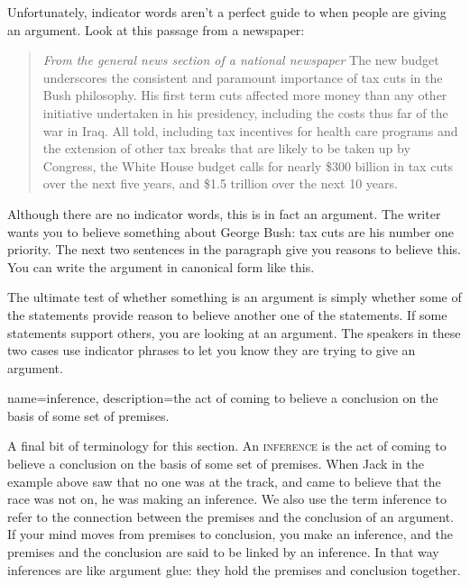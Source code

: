 Unfortunately, indicator words aren't a perfect guide to when people are giving an argument. Look at this passage from a newspaper:

\begin{quotation}
\noindent \textit{From the general news section of a national newspaper} The new budget underscores the consistent and paramount importance of tax cuts in the Bush philosophy. His first term cuts affected more money than any other initiative undertaken in his presidency, including the costs thus far of the war in Iraq. All told, including tax incentives for health care programs and the extension of other tax breaks that are likely to be taken up by Congress, the White House budget calls for nearly \$300 billion in tax cuts over the next five years, and \$1.5 trillion over the next 10 years.  \citep{Toner2006}
\end{quotation}

Although there are no indicator words, this is in fact an argument. The writer wants you to believe something about George Bush: tax cuts are his number one priority. The next two sentences in the paragraph give you reasons to believe this. You can write the argument in canonical form like this.

\begin{kormanize}
\end{kormanize}

The ultimate test of whether something is an argument is simply whether some of the statements provide reason to believe another one of the statements. If some statements support others, you are looking at an argument. The speakers in these two cases use indicator phrases to let you know they are trying to give an argument.

{
name=inference,
description={the act of coming to believe a conclusion on the basis of some set of premises.}
}

A final bit of terminology for this section. An \textsc{\gls{inference}} \label{def:Inference} is the act of coming to believe a conclusion on the basis of some set of premises. When Jack in the example above saw that no one was at the track, and came to believe that the race was not on, he was making an inference. We also use the term inference to refer to the connection between the premises and the conclusion of an argument. If your mind moves from premises to conclusion, you make an inference, and the premises and the conclusion are said to be linked by an inference. In that way inferences are like argument glue: they hold the premises and conclusion together.



